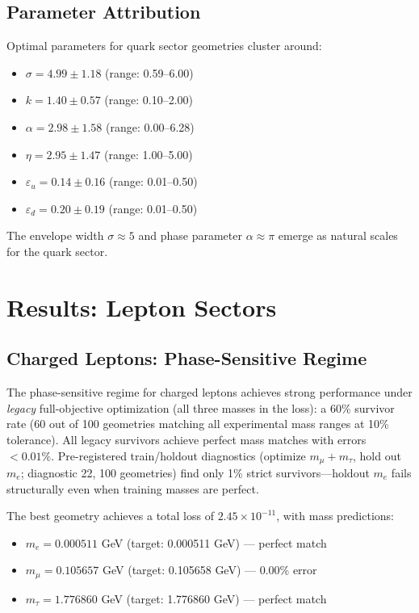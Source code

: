 \documentclass[12pt,a4paper]{article}
\begin{document}
\subsection{Parameter Attribution}

Optimal parameters for quark sector geometries cluster around:
\begin{itemize}
\item $\sigma = 4.99 \pm 1.18$ (range: 0.59--6.00)
\item $k = 1.40 \pm 0.57$ (range: 0.10--2.00)
\item $\alpha = 2.98 \pm 1.58$ (range: 0.00--6.28)
\item $\eta = 2.95 \pm 1.47$ (range: 1.00--5.00)
\item $\varepsilon_u = 0.14 \pm 0.16$ (range: 0.01--0.50)
\item $\varepsilon_d = 0.20 \pm 0.19$ (range: 0.01--0.50)
\end{itemize}

The envelope width $\sigma \approx 5$ and phase parameter $\alpha \approx \pi$ emerge as natural scales for the quark sector.

\section{Results: Lepton Sectors}

\subsection{Charged Leptons: Phase-Sensitive Regime}

The phase-sensitive regime for charged leptons achieves strong performance under \emph{legacy} full-objective optimization (all three masses in the loss): a 60\% survivor rate (60 out of 100 geometries matching all experimental mass ranges at 10\% tolerance). All legacy survivors achieve perfect mass matches with errors $< 0.01\%$. Pre-registered train/holdout diagnostics (optimize $m_\mu + m_\tau$, hold out $m_e$; diagnostic 22, 100 geometries) find only 1\% strict survivors---holdout $m_e$ fails structurally even when training masses are perfect.

The best geometry achieves a total loss of $2.45 \times 10^{-11}$, with mass predictions:
\begin{itemize}
\item $m_e = 0.000511$ GeV (target: 0.000511 GeV) --- perfect match
\item $m_\mu = 0.105657$ GeV (target: 0.105658 GeV) --- 0.00\% error
\item $m_\tau = 1.776860$ GeV (target: 1.776860 GeV) --- perfect match
\end{itemize}
\end{document}
